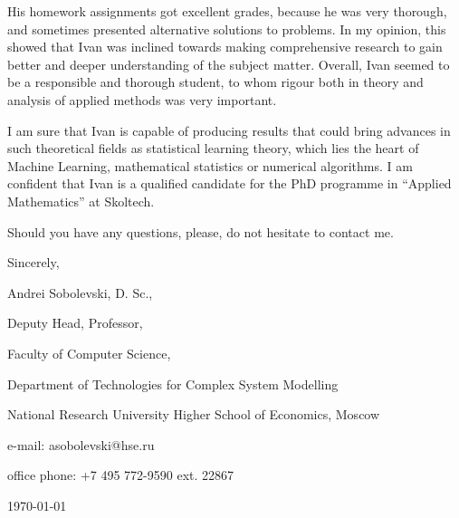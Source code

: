 \documentclass[14pt]{extarticle}
\begin{document}
His homework assignments got excellent grades, because he was very thorough, and
sometimes presented alternative solutions to problems. In my opinion, this showed
that Ivan was inclined towards making comprehensive research to gain better and deeper
understanding of the subject matter. Overall, Ivan seemed to be a responsible and
thorough student, to whom rigour both in theory and analysis of applied methods was
very important. \par\medskip

I am sure that Ivan is capable of producing results that could bring advances in such
theoretical fields as statistical learning theory, which lies the heart of Machine Learning,
mathematical statistics or numerical algorithms. I am confident that Ivan is a qualified
candidate for the PhD programme in ``Applied Mathematics'' at Skoltech. \par\medskip

Should you have any questions, please, do not hesitate to contact me. \par\bigskip

Sincerely, \par \medskip

Andrei Sobolevski, D. Sc., \par
Deputy Head, Professor, \par
Faculty of Computer Science, \par
Department of Technologies for Complex System Modelling \par
National Research University Higher School of Economics, Moscow \par

\hfill\par
e-mail: asobolevski@hse.ru \par
office phone: +7 495 772-9590 ext. 22867
\hfill\par
\hfill\today

\hfill 
\end{document}
